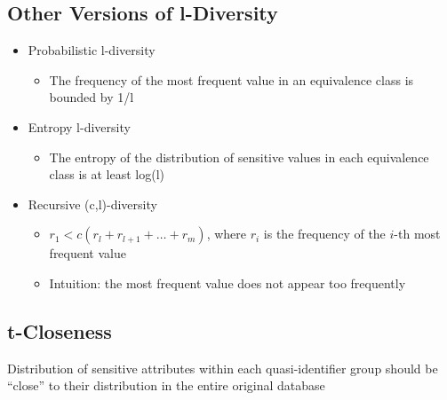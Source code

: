 \documentclass[11pt]{article}
\theoremstyle{definition}
\begin{document}
\subsection{Other Versions of l-Diversity}
\begin{itemize}
    \item Probabilistic l-diversity
    \begin{itemize}
        \item The frequency of the most frequent value in an equivalence class is bounded by 1/l
    \end{itemize}
    \item Entropy l-diversity
    \begin{itemize}
        \item The entropy of the distribution of sensitive values in each equivalence class is at least log(l)
    \end{itemize}
    \item Recursive (c,l)-diversity
    \begin{itemize}
        \item \( r_1 < c(r_l + r_{l+1} + \dots + r_m) \), where \( r_i \) is the frequency of the \( i \)-th most frequent value
        \item Intuition: the most frequent value does not appear too frequently
    \end{itemize}
\end{itemize}

\subsection{t-Closeness}
Distribution of sensitive
attributes within each
quasi-identifier group should
be “close” to their distribution
in the entire original database
\end{document}
